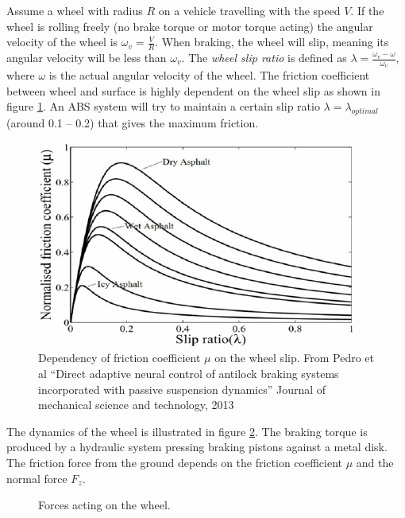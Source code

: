 \documentclass[letterpaper,12pt]{scrartcl}
\begin{document}
Assume a wheel with radius $R$ on a vehicle travelling with the speed $V$. If the wheel is rolling freely (no brake torque or motor torque acting) the angular velocity of the wheel is \(\omega_v = \frac{V}{R}\). When braking, the wheel will slip, meaning its angular velocity will be less than \(\omega_v\). The \emph{wheel slip ratio} is defined as \(\lambda = \frac{\omega_v - \omega}{\omega_v}\), where \(\omega\) is the actual angular velocity of the wheel. The friction coefficient between wheel and surface is highly dependent on the wheel slip as shown in figure \ref{fig:muslip}. An ABS system will try to maintain a certain slip ratio \(\lambda=\lambda_{optimal}\) (around 0.1 -- 0.2) that gives the maximum friction.
\begin{figure}[!h]
\begin{center}
\includegraphics[width=0.4\linewidth]{typical-friction.png}
\caption{Dependency of friction coefficient \(\mu\) on the wheel slip. {\footnotesize From Pedro et al ``Direct adaptive neural control of antilock braking systems incorporated with passive suspension dynamics''  Journal of mechanical science and technology, 2013}}
\label{fig:muslip}
\end{center}
\end{figure}

The dynamics of the wheel is illustrated in figure \ref{fig:wheeldynamics}. The braking torque is produced by a hydraulic system pressing braking pistons against a metal disk. The friction force from the ground depends on the friction coefficient $\mu$ and the normal force $F_z$. 
\begin{figure}[!h]
\begin{center}
\caption{Forces acting on the wheel.}
\label{fig:wheeldynamics}
\end{center}
\end{figure}
\end{document}
